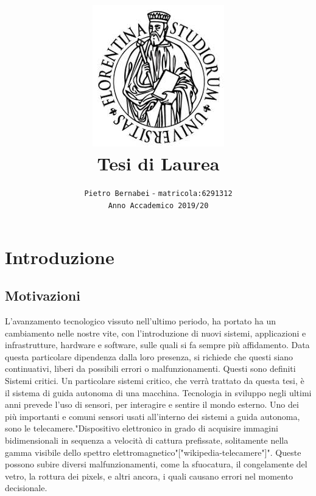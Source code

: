 \documentclass[14pt]{extarticle}
\begin{document}
\title{\includegraphics{download.jpeg} \vspace{2cm} \textbf{\\Tesi di Laurea}}

\author{\texttt{Pietro Bernabei} - \texttt{matricola:6291312}\\ \texttt{Anno Accademico 2019/20}}
\date{}
\maketitle
\newpage
\tableofcontents

\newpage
\section{Introduzione}
\subsection{Motivazioni}
L'avanzamento tecnologico vissuto nell'ultimo periodo,  ha portato ha un cambiamento nelle nostre vite, con l'introduzione di nuovi sistemi, applicazioni e infrastrutture, hardware e software, sulle quali si fa sempre più affidamento.
Data questa particolare dipendenza dalla loro presenza, si richiede che questi siano continuativi, liberi da possibili errori o malfunzionamenti. Questi sono definiti Sistemi critici.
Un particolare sistemi critico, che verrà trattato da questa tesi, è il sistema di guida autonoma di una macchina.
Tecnologia in sviluppo negli ultimi anni prevede l'uso di sensori, per interagire e sentire il mondo esterno. Uno dei più importanti e comuni sensori usati all'interno dei sistemi a guida autonoma, sono le telecamere."Dispositivo elettronico in grado di acquisire immagini bidimensionali in sequenza a velocità di cattura prefissate, solitamente nella gamma visibile dello spettro elettromagnetico"["wikipedia-telecamere"]". Queste possono subire diversi malfunzionamenti, come la sfuocatura, il congelamente del vetro, la rottura dei pixels, e altri ancora, i quali causano errori nel momento decisionale.
\end{document}
